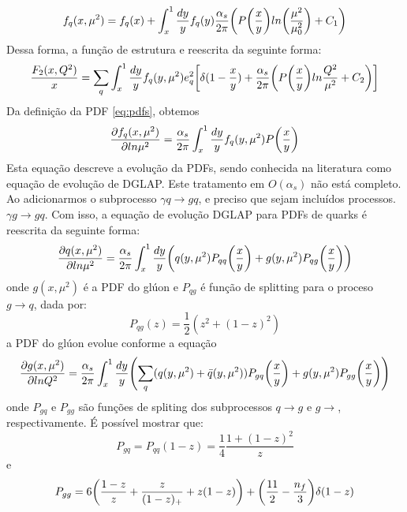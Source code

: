 \begin{equation}
    f_q(x, \mu^2) = f_ q (x) + \int^1_x \frac{dy}{y} f_q(y) \frac{\alpha_s}{2\pi} \qty(P\qty(\frac{x}{y}) ln\qty(\frac{\mu^2 }{\mu_0^2}) + C_1)
    \label{eq:pdfs}
\end{equation}
Dessa forma, a função de estrutura e reescrita da seguinte forma:
\begin{equation}
    \frac{F_2(x,Q^2)}{x} = \sum_q  \int^1_x \frac{dy}{y} f_q(y, \mu^2) e_q^2  \qty[\delta(1-\frac{x}{y}) + \frac{\alpha_s}{2\pi}\qty(P\qty(\frac{x}{y})ln\frac{Q^2}{\mu^2} + C_2)]
    \label{eq:fedglap2}
\end{equation}
Da definição da PDF \eqref{eq:pdfs}, obtemos
\begin{equation}
    \pdv{f_q(x, \mu^2)}{ln\mu^2} = \frac{\alpha_s}{2\pi}\int^1_x \frac{dy}{y} f_q(y, \mu^2) P\qty(\frac{x}{y})
\end{equation}
Esta equação descreve a evolução da PDFs, sendo conhecida na literatura como equação de evolução de DGLAP. Este tratamento em  $O(\alpha_s)$ não está completo. Ao adicionarmos o subprocesso $\gamma q \rightarrow gq$, e preciso que sejam incluídos processos. $\gamma g \rightarrow gq$. Com isso, a equação de evolução DGLAP para PDFs de quarks é reescrita da seguinte forma:
\begin{equation}
    \pdv{q(x, \mu^2)}{ln\mu^2} = \frac{\alpha_s}{2\pi}\int^1_x \frac{dy}{y}\qty(q(y, \mu^2) P_{qq}\qty(\frac{x}{y}) +  g(y, \mu^2) P_{qg}\qty(\frac{x}{y}) )
\end{equation}
onde $g(x,\mu^2)$ é a PDF do glúon e $P_{qg}$ é função de splitting para o proceso  $g\rightarrow q$, dada por:
\begin{equation}
    P_{qg}(z) = \frac{1}{2}(z^2 + (1-z) ^2)
\end{equation}
a PDF do glúon evolue conforme a equação
\begin{equation}
    \pdv{g(x, \mu^2)}{lnQ^2} = \frac{\alpha_s}{2\pi}\int^1_x \frac{dy}{y}\qty(\sum_q(q(y, \mu^2) + \bar{q}(y, \mu^2)) P_{gq}\qty(\frac{x}{y}) +  g(y, \mu^2) P_{gg}\qty(\frac{x}{y}) )
\end{equation}
onde  $P_{gq}$ e $P_{gg}$ são funções de spliting dos subprocessos $q\rightarrow g$ e $g\rightarrow$, respectivamente. É possível mostrar que:
\begin{equation}
    P_{gq} = P_{qq}(1-z) = \frac{1}{4}\frac{1+(1-z)^2}{z}
\end{equation}
e
\begin{equation}
    P_{gg} = 6\qty(\frac{1-z}{z} + \frac{z}{(1-z)_+} + z(1-z)) + \qty(\frac{11}{2} - \frac{n_f}{3})\delta(1-z)
\end{equation}
